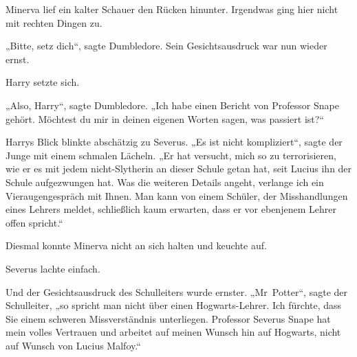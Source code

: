 Minerva lief ein kalter Schauer den Rücken hinunter. Irgendwas ging hier nicht mit rechten Dingen zu.

„Bitte, setz dich“, sagte Dumbledore. Sein Gesichtsausdruck war nun wieder ernst.

Harry setzte sich.

„Also, Harry“, sagte Dumbledore. „Ich habe einen Bericht von Professor Snape gehört. Möchtest du mir in deinen eigenen Worten sagen, was passiert ist?“

Harrys Blick blinkte abschätzig zu Severus. „Es ist nicht kompliziert“, sagte der Junge mit einem schmalen Lächeln. „Er hat versucht, mich so zu terrorisieren, wie er es mit jedem nicht-Slytherin an dieser Schule getan hat, seit Lucius ihn der Schule aufgezwungen hat. Was die weiteren Details angeht, verlange ich ein Vieraugengespräch mit Ihnen. Man kann von einem Schüler, der Misshandlungen eines Lehrers meldet, schließlich kaum erwarten, dass er vor ebenjenem Lehrer offen spricht.“

Diesmal konnte Minerva nicht an sich halten und keuchte auf.

Severus lachte einfach.

Und der Gesichtsausdruck des Schulleiters wurde ernster. „Mr~Potter“, sagte der Schulleiter, „so spricht man nicht über einen Hogwarts-Lehrer. Ich fürchte, dass Sie einem schweren Missverständnis unterliegen. Professor Severus Snape hat mein volles Vertrauen und arbeitet auf meinen Wunsch hin auf Hogwarts, nicht auf Wunsch von Lucius Malfoy.“

